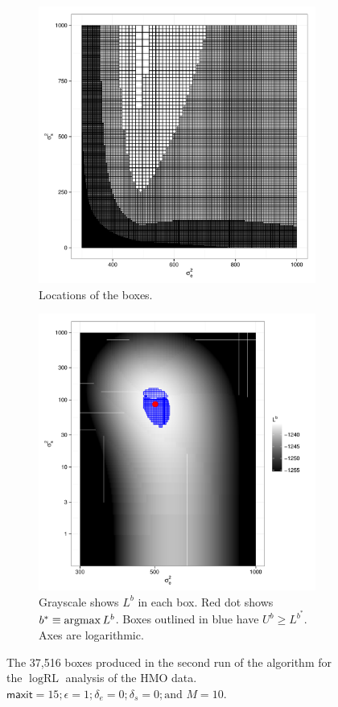 \documentclass{report}
\newcommand{\textcompute}{\textsf}
\newcommand{\RLorig}{\text{RL}}
\newcommand{\logRLorig}{\log\RLorig}
\newcommand{\maxit}{\textcompute{maxit}}
\newcommand{\argmax}{\operatornamewithlimits{argmax}}
\begin{document}
\begin{figure}
  \begin{subfigure}{.5\textwidth}
	\centering
	\includegraphics[width=.8\linewidth]{figs/hmo_HH11_boxes2.pdf}
	\caption{Locations of the boxes.}
	\label{fig:hmoboxes2}
  \end{subfigure}
  \begin{subfigure}{.5\textwidth}
	\centering
	\includegraphics[width=.8\linewidth]{figs/hmo_HH11_rll2.pdf}
	\caption{Grayscale shows $L^b$ in each box.  Red dot shows $b^* \equiv\argmax L^b$.
	Boxes outlined in blue have $U^b \ge L^{b^*}$.  Axes are logarithmic.}
	\label{fig:hmorll2}
  \end{subfigure}
  \caption{The 37,516 boxes produced in the second run of the algorithm for the
	$\logRLorig$ analysis of the HMO data. $\maxit=15; \epsilon=1;
	\delta_e=0; \delta_s=0; \text{and\ } M=10$.}
  \label{fig:hmo2}
\end{figure}
\end{document}
